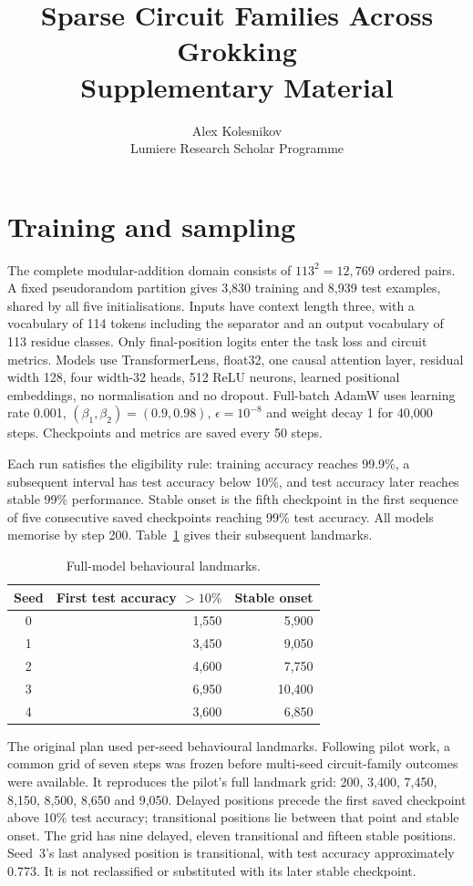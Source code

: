 \documentclass[10pt]{article}
\title{Sparse Circuit Families Across Grokking\\Supplementary Material}
\author{\name Alex Kolesnikov \\
\addr Lumiere Research Scholar Programme}
\begin{document}
\maketitle
\section{Training and sampling}
The complete modular-addition domain consists of $113^2=12,769$ ordered pairs. A fixed pseudorandom partition gives 3,830 training and 8,939 test examples, shared by all five initialisations. Inputs have context length three, with a vocabulary of 114 tokens including the separator and an output vocabulary of 113 residue classes. Only final-position logits enter the task loss and circuit metrics. Models use TransformerLens, float32, one causal attention layer, residual width 128, four width-32 heads, 512 ReLU neurons, learned positional embeddings, no normalisation and no dropout. Full-batch AdamW uses learning rate 0.001, $(\beta_1,\beta_2)=(0.9,0.98)$, $\epsilon=10^{-8}$ and weight decay 1 for 40,000 steps. Checkpoints and metrics are saved every 50 steps.

Each run satisfies the eligibility rule: training accuracy reaches 99.9\%, a subsequent interval has test accuracy below 10\%, and test accuracy later reaches stable 99\% performance. Stable onset is the fifth checkpoint in the first sequence of five consecutive saved checkpoints reaching 99\% test accuracy. All models memorise by step 200. Table~\ref{tab:landmarks} gives their subsequent landmarks.
\begin{table}[h]
\centering
\caption{Full-model behavioural landmarks.}\label{tab:landmarks}
\begin{tabular}{crr}
\toprule Seed & First test accuracy $>10\%$ & Stable onset\\\midrule
0 & 1,550 & 5,900\\
1 & 3,450 & 9,050\\
2 & 4,600 & 7,750\\
3 & 6,950 & 10,400\\
4 & 3,600 & 6,850\\\bottomrule
\end{tabular}
\end{table}

The original plan used per-seed behavioural landmarks. Following pilot work, a common grid of seven steps was frozen before multi-seed circuit-family outcomes were available. It reproduces the pilot's full landmark grid: 200, 3,400, 7,450, 8,150, 8,500, 8,650 and 9,050. Delayed positions precede the first saved checkpoint above 10\% test accuracy; transitional positions lie between that point and stable onset. The grid has nine delayed, eleven transitional and fifteen stable positions. Seed~3's last analysed position is transitional, with test accuracy approximately 0.773. It is not reclassified or substituted with its later stable checkpoint.
\end{document}
